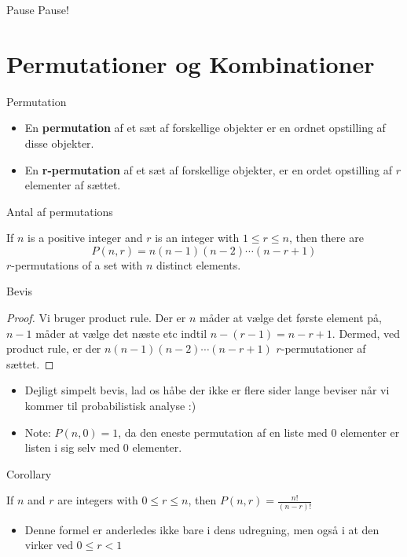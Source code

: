 \documentclass{beamer}
\begin{document}
\begin{frame}{Pause}
    Pause!
\end{frame}


\section{Permutationer og Kombinationer}

\begin{frame}{Permutation}
\begin{itemize}
    \item<1-> En \textbf{permutation} af et sæt af forskellige objekter er en ordnet opstilling af disse objekter. 
    \item<1-> En \textbf{r-permutation} af et sæt af forskellige objekter, er en ordet opstilling af $r$ elementer af sættet. 
\end{itemize}
\end{frame}

\begin{frame}{Antal af permutations}
\begin{theorem}
    If $n$ is a positive integer and $r$ is an integer with $1 \leq r \leq n$, then there are 
    $$P(n,r) = n(n-1)(n-2) \cdots (n-r+1)$$
    $r$-permutations of a set with $n$ distinct elements. 
\end{theorem}
\end{frame}

\begin{frame}{Bevis}
    \begin{proof}
        Vi bruger product rule. Der er $n$ måder at vælge det første element på, $n-1$ måder at vælge det næste etc indtil $n-(r-1) = n - r + 1$. Dermed, ved product rule, er der $n(n-1)(n-2) \cdots (n-r+1)$ $r$-permutationer af sættet.
    \end{proof}
    \begin{itemize}
        \item Dejligt simpelt bevis, lad os håbe der ikke er flere sider lange beviser når vi kommer til probabilistisk analyse :) 
        \item Note: $P(n,0) = 1$, da den eneste permutation af en liste med 0 elementer er listen i sig selv med 0 elementer.
    \end{itemize}
\end{frame}

\begin{frame}{Corollary}
\begin{corollary}
    If $n$ and $r$ are integers with $0 \leq r \leq n$, then $P(n,r) = \frac{n!}{(n-r)!}$
\end{corollary}
\begin{itemize}
    \item Denne formel er anderledes ikke bare i dens udregning, men også i at den virker ved $0 \leq r < 1$
\end{itemize}
\end{frame}
\end{document}
